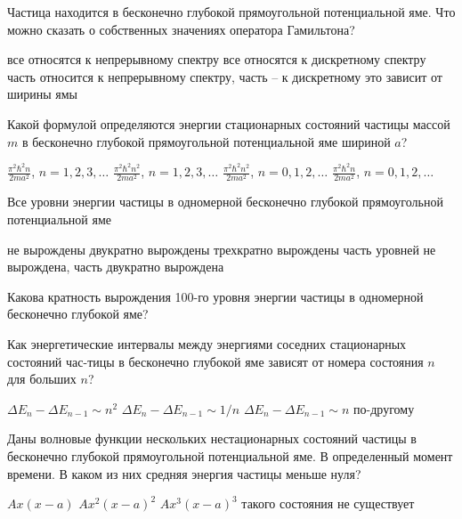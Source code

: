 \documentclass[11pt,a4paper]{exam}
\begin{document}
\begin{questions}

\question Частица находится в бесконечно глубокой прямоугольной потенциальной яме. Что можно сказать о собственных значениях оператора Гамильтона?
\begin{choices}
\choice все относятся к непрерывному спектру
\choice все относятся к дискретному спектру
\choice часть относится к непрерывному спектру, часть – к дискретному
\choice это зависит от ширины ямы
\end{choices}

\question Какой формулой определяются энергии стационарных состояний частицы массой $m$ в бесконечно глубокой прямоугольной потенциальной яме шириной $a$?
\begin{choices}
\choice $\frac{{{\pi ^2}{\hbar ^2}n}}{{2m{a^2}}}$, $n = 1,2,3, \ldots $      
\choice $\frac{{{\pi ^2}{\hbar ^2}{n^2}}}{{2m{a^2}}}$, $n = 1,2,3, \ldots $
\choice $\frac{{{\pi ^2}{\hbar ^2}{n^2}}}{{2m{a^2}}}$, $n = 0,1,2, \ldots $     
\choice $\frac{{{\pi ^2}{\hbar ^2}n}}{{2m{a^2}}}$, $n = 0,1,2, \ldots $
\end{choices}

\question Все уровни энергии частицы в одномерной бесконечно глубокой прямоугольной потенциальной яме
\begin{choices}
\choice не вырождены         
\choice двукратно вырождены
\choice трехкратно вырождены    
\choice часть уровней не вырождена, часть двукратно вырождена
\end{choices}

\question Какова кратность вырождения 100-го уровня энергии частицы в одномерной бесконечно глубокой яме?
\begin{choices}
\end{choices}

\question Как энергетические интервалы между энергиями соседних стационарных состояний час-тицы в бесконечно глубокой яме зависят от номера состояния $n$ для больших $n$? 
\begin{choices}
\choice $\Delta {E_n} - \Delta {E_{n - 1}} \sim {n^2}$        
\choice $\Delta {E_n} - \Delta {E_{n - 1}} \sim 1/n$
\choice $\Delta {E_n} - \Delta {E_{n - 1}} \sim n$         
\choice по-другому
\end{choices}

\question Даны волновые функции нескольких нестационарных состояний частицы в бесконечно глубокой прямоугольной потенциальной яме. В определенный момент времени. В каком из них средняя энергия частицы меньше нуля?
\begin{choices}
\choice $Ax(x - a)$           
\choice $A{x^2}{(x - a)^2}$   
\choice $A{x^3}{(x - a)^3}$         
\choice такого состояния не существует
\end{choices}


\end{questions}
\end{document}
